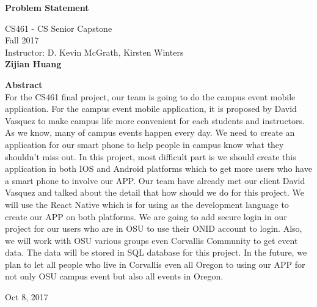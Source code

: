 \documentclass[10pt,letterpaper]{article}
\begin{document}
\begin{titlepage}
\begin{center}
    \Huge
    \textbf{Problem Statement}
    
    \vspace{0.5in}
    \large
    CS461 - CS Senior Capstone\\
    
    \vspace{0.2in}
    \large
    Fall 2017\\
    
    \vspace{0.2in}
    \large
    Instructor: D. Kevin McGrath, Kirsten Winters\\
    
    \vspace{0.2in}
    \textbf{Zijian Huang}
    
    \vspace{0.5in}
    \textbf{Abstract}\\
    \vspace{0.2in}
    For the CS461 final project, our team is going to do the campus event mobile application. For the campus event mobile application, it is proposed by David Vasquez to make campus life more convenient for each students and instructors. As we know, many of campus events happen every day. We need to create an application for our smart phone to help people in campus know what they shouldn’t miss out. In this project, most difficult part is we should create this application in both IOS and Android platforms which to get more users who have a smart phone to involve our APP. 
Our team have already met our client David Vasquez and talked about the detail that how should we do for this project. We will use the React Native which is for using as the development language to create our APP on both platforms. We are going to add secure login in our project for our users who are in OSU to use their ONID account to login. Also, we will work with OSU various groups even Corvallis Community to get event data. The data will be stored in SQL database for this project. In the future, we plan to let all people who live in Corvallis even all Oregon to using our APP for not only OSU campus event but also all events in Oregon. 
    
    \vspace{0.3in}
    \vfill
    
    Oct 8, 2017

\end{center}
\end{titlepage}
\end{document}
